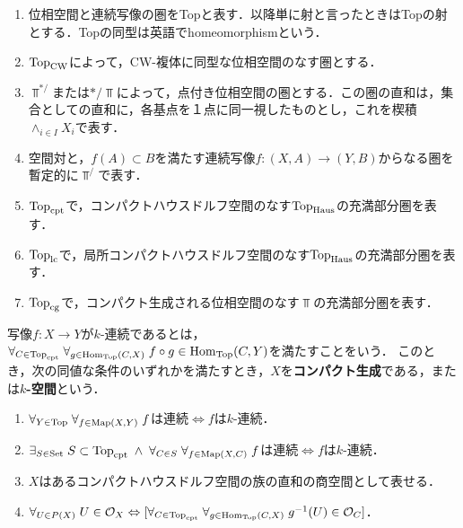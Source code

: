 \documentclass[uplatex,dvipdfmx]{jsreport}
\begin{document}
\begin{notation}[生息する圏]\mbox{}
    \begin{enumerate}
        \item 位相空間と連続写像の圏をTopと表す．以降単に射と言ったときはTopの射とする．Topの同型は英語でhomeomorphismという．
        \item $\mathrm{Top}_{\mathrm{CW}}$によって，CW-複体に同型な位相空間のなす圏とする．
        \item $\Top^{*/}$または$*/\Top$によって，点付き位相空間の圏とする．この圏の直和は，集合としての直和に，各基点を１点に同一視したものとし，これを楔積$\wedge_{i\in I}X_i$で表す．
        \item 空間対と，$f(A)\subset B$を満たす連続写像$f:(X,A)\to (Y,B)$からなる圏を暫定的に$\Top^{/}$で表す．
        \item $\mathrm{Top}_{\mathrm{cpt}}$で，コンパクトハウスドルフ空間のなす$\mathrm{Top}_{\mathrm{Haus}}$の充満部分圏を表す．
        \item $\mathrm{Top}_{\mathrm{lc}}$で，局所コンパクトハウスドルフ空間のなす$\mathrm{Top}_{\mathrm{Haus}}$の充満部分圏を表す．
        \item $\mathrm{Top}_{\mathrm{cg}}$で，コンパクト生成される位相空間のなす$\Top$の充満部分圏を表す．
    \end{enumerate}
\end{notation}

\begin{definition}
    写像$f:X\to Y$が$k$-連続であるとは，$\forall_{C\in\mathrm{Top}_{\mathrm{cpt}}}\;\forall_{g\in\mathrm{Hom}_{\mathrm{Top}}(C,X)}\;f\circ g\in\mathrm{Hom}_{\mathrm{Top}}(C,Y)$を満たすことをいう．
    このとき，次の同値な条件のいずれかを満たすとき，$X$を\textbf{コンパクト生成}である，または\textbf{$k$-空間}という．
    \begin{enumerate}
        \item $\forall_{Y\in\mathrm{Top}}\;\forall_{f\in\mathrm{Map}(X,Y)}\;f$は連続$\Leftrightarrow f$は$k$-連続．
        \item $\exists_{S\in\mathrm{Set}}\;S\subset\mathrm{Top}_{\mathrm{cpt}}\;\land\;\forall_{C\in S}\;\forall_{f\in\mathrm{Map}(X,C)}\;f$は連続$\Leftrightarrow f$は$k$-連続．
        \item $X$はあるコンパクトハウスドルフ空間の族の直和の商空間として表せる．
        \item $\forall_{U\in P(X)}\;U\in\mathcal{O}_X\Leftrightarrow[\forall_{C\in\mathrm{Top}_{\mathrm{cpt}}}\;\forall_{g\in\mathrm{Hom}_{\mathrm{Top}}(C,X)}\;g^{-1}(U)\in\mathcal{O}_C]$．
    \end{enumerate}
\end{definition}
\end{document}
